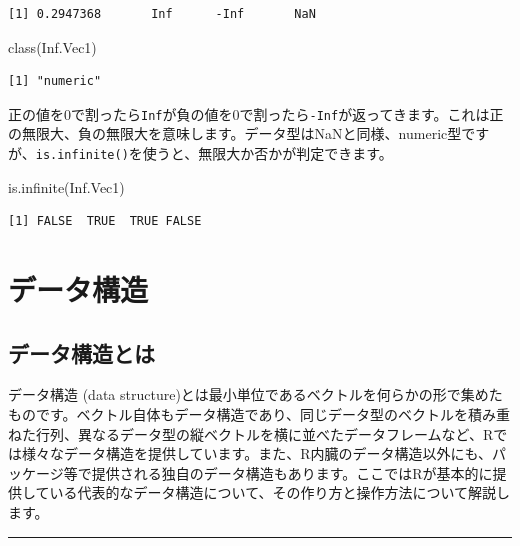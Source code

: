\documentclass[
  a4paper,
  pandoc,
  ja=standard,
  jafont=haranoaji]{bxjsbook}
\newenvironment{Shaded}{\begin{snugshade}}{\end{snugshade}}
\newcommand{\FunctionTok}[1]{\textcolor[rgb]{0.28,0.35,0.67}{#1}}
\newcommand{\NormalTok}[1]{\textcolor[rgb]{0.00,0.48,0.65}{#1}}
\begin{document}
\begin{verbatim}
[1] 0.2947368       Inf      -Inf       NaN
\end{verbatim}

\begin{Shaded}
\begin{Highlighting}[numbers=left,,]
\FunctionTok{class}\NormalTok{(Inf.Vec1)}
\end{Highlighting}
\end{Shaded}

\begin{verbatim}
[1] "numeric"
\end{verbatim}

正の値を0で割ったら\texttt{Inf}が負の値を0で割ったら\texttt{-Inf}が返ってきます。これは正の無限大、負の無限大を意味します。データ型はNaNと同様、numeric型ですが、\texttt{is.infinite()}を使うと、無限大か否かが判定できます。

\begin{Shaded}
\begin{Highlighting}[numbers=left,,]
\FunctionTok{is.infinite}\NormalTok{(Inf.Vec1)}
\end{Highlighting}
\end{Shaded}

\begin{verbatim}
[1] FALSE  TRUE  TRUE FALSE
\end{verbatim}

\hypertarget{sec-datastructure}{%
\chapter{データ構造}\label{sec-datastructure}}

\hypertarget{sec-datastructure_intro}{%
\section{データ構造とは}\label{sec-datastructure_intro}}

データ構造 (data
structure)とは最小単位であるベクトルを何らかの形で集めたものです。ベクトル自体もデータ構造であり、同じデータ型のベクトルを積み重ねた行列、異なるデータ型の縦ベクトルを横に並べたデータフレームなど、Rでは様々なデータ構造を提供しています。また、R内臓のデータ構造以外にも、パッケージ等で提供される独自のデータ構造もあります。ここではRが基本的に提供している代表的なデータ構造について、その作り方と操作方法について解説します。

\begin{center}\rule{0.5\linewidth}{0.5pt}\end{center}
\end{document}
